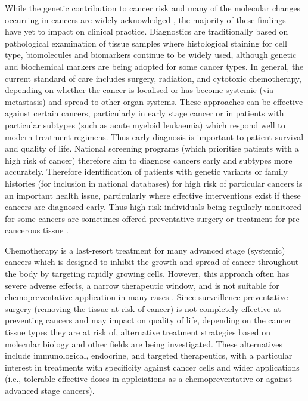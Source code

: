 While the genetic contribution to cancer risk and many of the molecular changes occurring in cancers are widely acknowledged \citep{CancerResearchUK2017, ASCO2017, CSNZ2017}, the majority of these findings have yet to impact on clinical practice. Diagnostics are traditionally based on pathological examination of tissue samples where histological staining for cell type, biomolecules and biomarkers continue to be widely used, although genetic and biochemical markers are being adopted for some cancer types. In general, the current standard of care includes surgery, radiation, and cytotoxic chemotherapy, depending on whether the cancer is localised or has become systemic (via metastasis) and spread to other organ systems. These approaches can be effective against certain cancers, particularly in early stage cancer or in patients with particular subtypes (such as acute myeloid leukaemia) which respond well to modern treatment regimens. Thus early diagnosis is important to patient survival and quality of life. National screening programs (which prioritise patients with a high risk of cancer) therefore aim to diagnose cancers early and subtypes more accurately. Therefore identification of patients with genetic variants or family histories (for inclusion in national databases) for high risk of particular cancers is an important health issue, particularly where effective interventions exist if these cancers are diagnosed early. Thus high risk individuals being regularly monitored for some cancers are sometimes offered preventative surgery or treatment for pre-cancerous tissue \citep{Guilford2010, Scheuer2002}. 

Chemotherapy is a last-resort treatment for many advanced stage (systemic) cancers which is designed to inhibit the growth and spread of cancer throughout the body by targeting rapidly growing cells. However, this approach often has severe adverse effects, a narrow therapeutic window, and is not suitable for chemopreventative application in many cases \citep{Kaelin2009}. Since surveillence preventative surgery (removing the tissue at risk of cancer) is not completely effective at preventing cancers and may impact on quality of life, depending on the cancer tissue types they are at risk of, alternative treatment strategies based on molecular biology and other fields are being investigated. These alternatives include immunological, endocrine, and targeted therapeutics, with a particular interest in treatments with specificity against cancer cells and wider applications (i.e., tolerable effective doses in applciations as a chemopreventative or against advanced stage cancers).

